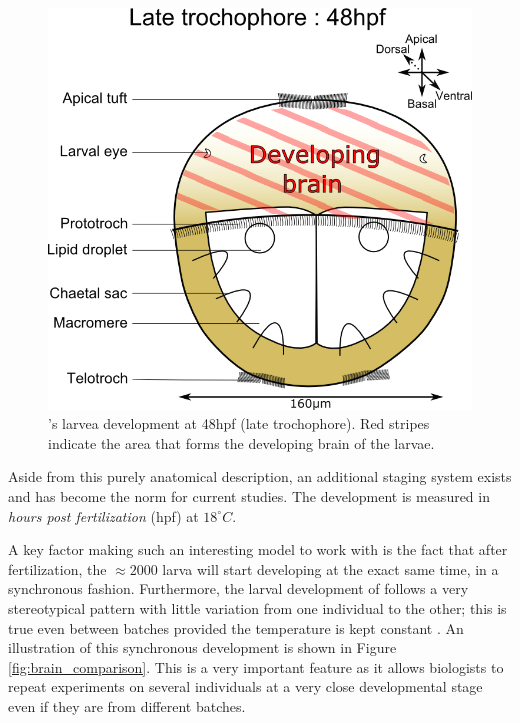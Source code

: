 \begin{figure}[bth]
\begin{center}
  \includegraphics[width=\linewidth]{gfx/chapter1/larvae48hpf.png}
\end{center}
  \caption{\platyfull{}'s larvea development at 48hpf (late trochophore). Red stripes indicate the area that forms the developing brain of the larvae.}
  \label{fig:platynereis_larvae_scheme}
\end{figure}
    
    Aside from this purely anatomical description, an additional staging system exists and has become the norm for current studies. The development is measured in \textit{hours post fertilization} (hpf) at $18^{\circ}C$.
    
    A key factor making \platy{} such an interesting model to work with is the fact that after fertilization, the $\approx 2000$ larva will start developing at the exact same time, in a synchronous fashion. Furthermore, the larval development of \platy{} follows a very stereotypical pattern with little variation from one individual to the other; this is true even between batches provided the temperature is kept constant \citep{fischer04,dorresteijn90}. An illustration of this synchronous development is shown in Figure \ref{fig:brain_comparison}. This is a very important feature as it allows biologists to repeat experiments on several individuals at a very close developmental stage even if they are from different batches.\\
    
